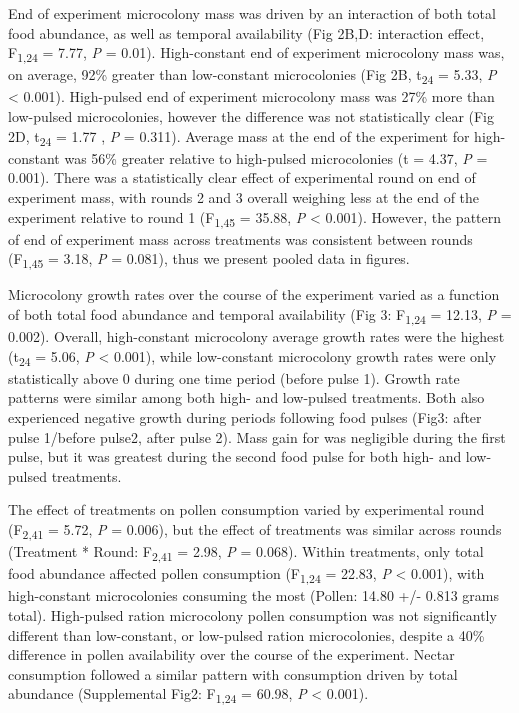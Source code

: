 \documentclass[11pt,]{article}
\begin{document}
End of experiment microcolony mass was driven by an interaction of both
total food abundance, as well as temporal availability (Fig 2B,D:
interaction effect, F\textsubscript{1,24} = 7.77, \emph{P} = 0.01).
High-constant end of experiment microcolony mass was, on average, 92\%
greater than low-constant microcolonies (Fig 2B, t\textsubscript{24} =
5.33, \emph{P} \textless{} 0.001). High-pulsed end of experiment
microcolony mass was 27\% more than low-pulsed microcolonies, however
the difference was not statistically clear (Fig 2D, t\textsubscript{24}
= 1.77 , \emph{P} = 0.311). Average mass at the end of the experiment
for high-constant was 56\% greater relative to high-pulsed microcolonies
(t = 4.37, \emph{P} = 0.001). There was a statistically clear effect of
experimental round on end of experiment mass, with rounds 2 and 3
overall weighing less at the end of the experiment relative to round 1
(F\textsubscript{1,45} = 35.88, \emph{P} \textless{} 0.001). However,
the pattern of end of experiment mass across treatments was consistent
between rounds (F\textsubscript{1,45} = 3.18, \emph{P} = 0.081), thus we
present pooled data in figures.

Microcolony growth rates over the course of the experiment varied as a
function of both total food abundance and temporal availability (Fig 3:
F\textsubscript{1,24} = 12.13, \emph{P} = 0.002). Overall, high-constant
microcolony average growth rates were the highest (t\textsubscript{24} =
5.06, \emph{P} \textless{} 0.001), while low-constant microcolony growth
rates were only statistically above 0 during one time period (before
pulse 1). Growth rate patterns were similar among both high- and
low-pulsed treatments. Both also experienced negative growth during
periods following food pulses (Fig3: after pulse 1/before pulse2, after
pulse 2). Mass gain for was negligible during the first pulse, but it
was greatest during the second food pulse for both high- and low-pulsed
treatments.

The effect of treatments on pollen consumption varied by experimental
round (F\textsubscript{2,41} = 5.72, \emph{P} = 0.006), but the effect
of treatments was similar across rounds (Treatment * Round:
F\textsubscript{2,41} = 2.98, \emph{P} = 0.068). Within treatments, only
total food abundance affected pollen consumption (F\textsubscript{1,24}
= 22.83, \emph{P} \textless{} 0.001), with high-constant microcolonies
consuming the most (Pollen: 14.80 +/- 0.813 grams total). High-pulsed
ration microcolony pollen consumption was not significantly different
than low-constant, or low-pulsed ration microcolonies, despite a 40\%
difference in pollen availability over the course of the experiment.
Nectar consumption followed a similar pattern with consumption driven by
total abundance (Supplemental Fig2: F\textsubscript{1,24} = 60.98,
\emph{P} \textless{} 0.001).
\end{document}
